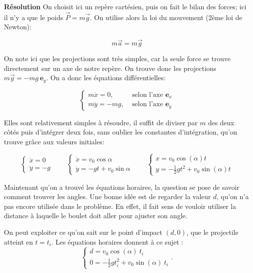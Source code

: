 \documentclass{article}
\begin{document}
\noindent \begin{minipage}{\linewidth}
\noindent\textbf{Résolution}
On choisit ici un repère cartésien, puis on fait le bilan des forces; ici il n'y a que le poids $\vec{P} = m \vec{g}$. On utilise alors la loi du mouvement (2ème loi de Newton): 
\end{minipage}
\[m \vec{a} = m \vec{g}\]
 
On note ici que les projections sont très simples, car la seule force se trouve directement sur un axe de notre repère. On trouve donc les projections $m \vec{g} = - m g \: \mathbf{e}_y$. On a donc les équations différentielles:

\begin{equation*}
   \begin{cases}
     m \ddot{x} = 0, & \mbox{ selon l'axe $\mathbf{e}_x$}\\
    m \ddot{y} = -mg, & \mbox{ selon l'axe $\mathbf{e}_y$}
   \end{cases} 
\end{equation*}


Elles sont relativement simples à résoudre, il suffit de diviser par $m$ des deux côtés puis d'intégrer deux fois, sans oublier les constantes d'intégration, qu'on trouve grâce aux valeurs initiales: 


\begin{equation*}
   \begin{cases}
   \ddot{x} = 0 \\
   \ddot{y} = -g 
   \end{cases} 
   \qquad
   \begin{cases}
   \dot{x} = v_0 \cos{\alpha} \\
   \dot{y} = -gt + v_0 \sin{\alpha} 
   \end{cases} 
   \qquad
   \begin{cases}
   x = v_0 \cos{(\alpha)}t \\
   y = -\frac{1}{2}gt^2 + v_0 \sin{(\alpha)} t
   \end{cases} 
\end{equation*}

Maintenant qu'on a trouvé les équations horaires, la question se pose de savoir comment trouver les angles. Une bonne idée est de regarder la valeur $d$, qu'on n'a pas encore utilisée dans le problème. En effet, il fait sens de vouloir utiliser la distance à laquelle le boulet doit aller pour ajuster son angle.

On peut exploiter ce qu'on sait sur le point d'impact $(d, 0)$, que le projectile atteint en $t = t_i$. Les équations horaires donnent à ce sujet : 
\begin{equation*}
   \begin{cases}
    d = v_0 \cos{(\alpha)} \: t_i \\
    0 = -\frac{1}{2}g t_{i}^2 + v_0 \sin{(\alpha)} \: t_i
   \end{cases}. 
\end{equation*}
\end{document}

